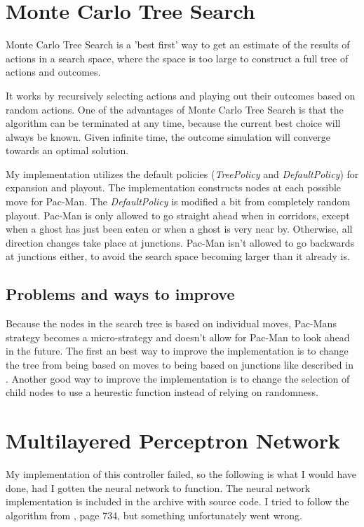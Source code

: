 \documentclass[conference]{IEEEtran}
\begin{document}
\section{Monte Carlo Tree Search}

Monte Carlo Tree Search is a 'best first' way to get an estimate of the results of actions in a search space, where the space is too large to construct a full tree of actions and outcomes.

It works by recursively selecting actions and playing out their outcomes based on random actions.
One of the advantages of Monte Carlo Tree Search is that the algorithm can be terminated at any time, because the current best choice will always be known. Given infinite time, the outcome simulation will converge towards an optimal solution.

My implementation utilizes the default policies (\emph{TreePolicy} and \emph{DefaultPolicy}) for expansion and playout. The implementation
constructs nodes at each possible move for Pac-Man. The \emph{DefaultPolicy} is modified a bit from completely random playout. Pac-Man is only allowed to go straight ahead when in corridors, except when a ghost has just been eaten or when a ghost is very near by. Otherwise, all direction changes take place at junctions. Pac-Man isn't allowed to go backwards at junctions either, to avoid the search space becoming larger than it already is.

\subsection*{Problems and ways to improve}

Because the nodes in the search tree is based on individual moves, Pac-Mans strategy becomes a micro-strategy and doesn't allow for Pac-Man to look ahead in the future. The first an best way to improve the implementation is to change the tree from being based on moves to being based on junctions like described in \cite{enhancements}. Another good way to improve the implementation is to change the selection of
child nodes to use a heurestic function instead of relying on randomness.

\section{Multilayered Perceptron Network}

My implementation of this controller failed, so the following is what I would have done, had I gotten the neural network to function. The neural network implementation is included in the archive with source code. I tried to follow the algorithm from \cite{aima}, page 734, but something unfortunately went wrong.
\end{document}
